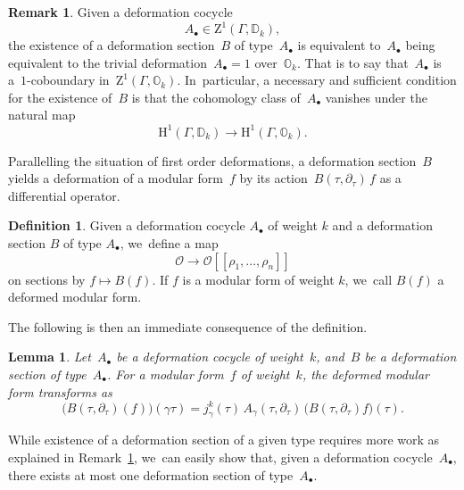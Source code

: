 \documentclass[JEP,XML,SOM,Unicode,published]{cedram}
\let\oldbullet\bullet
\renewcommand{\bullet}{{\scriptscriptstyle\oldbullet}}
\theoremstyle{plain}
\newtheorem{lemma}[theoremcounter]{Lemma}
\theoremstyle{definition}
\newtheorem{definition}[theoremcounter]{Definition}
\newtheorem{remark}[theoremcounter]{Remark}
\newcommand{\tx}{\text}
\newcommand{\bbD}{\ensuremath{\mathbb{D}}}
\newcommand{\bbO}{\ensuremath{\mathbb{O}}}
\newcommand{\cO}{\ensuremath{\mathcal{O}}}
\newcommand{\rmH}{\ensuremath{\mathrm{H}}}
\newcommand{\rmZ}{\ensuremath{\mathrm{Z}}}
\newcommand{\llbrkt}{[\![}
\newcommand{\rrbrkt}{]\!]}
\let\Ga\Gamma
\let\ga\gamma
\begin{document}
\begin{remark}
\label{rm:algebraic_deformation_section_existence}
Given a deformation cocycle
\begin{equation*}A_\bullet\in \rmZ^1(\Ga,\bbD_k),\end{equation*}
the existence of a deformation section~$B$ of type~$A_\bullet$ is equivalent to~$A_\bullet$ being equivalent to the trivial deformation~$A_\bullet=1$ over~$\bbO_k$. That is to say that~$A_\bullet$ is a~$1$-coboundary in~$\rmZ^1(\Ga,\bbO_k)$. In~particular, a necessary and sufficient condition for the existence of~$B$ is that the cohomology class of~$A_\bullet$ vanishes under the natural map
\begin{equation*}\rmH^1(\Ga,\bbD_k) \to \rmH^1(\Ga,\bbO_k)\tx{.}\end{equation*}
\end{remark}

Parallelling the situation of first order deformations, a deformation section~$B$ yields a deformation of a modular form~$f$ by its action~$B(\tau, \partial_\tau)\, f$ as a differential operator.

\begin{definition}\label{def:deformed-forms}
Given a deformation cocycle $A_\bullet$ of weight $k$ and a deformation section $B$ of type $A_\bullet$, we~define a map
\begin{equation*}\cO\to \cO \llbrkt \rho_1,\ldots,\rho_n\rrbrkt\end{equation*}
on sections by $f\mapsto B(f)$. If $f$ is a modular form of weight $k$, we~call $B(f)$ a deformed modular form.
\end{definition}

The following is then an immediate consequence of the definition.

\begin{lemma}
\label{lem:deformed-transformation}
Let~$A_\bullet$ be a deformation cocycle of weight~$k$, and~$B$ be a deformation section of type~$A_\bullet$. For a modular form~$f$ of weight~$k$, the deformed modular form transforms as
\begin{equation*}
\bigl(B(\tau, \partial_\tau)(f) \bigr)(\ga\tau)
=
j_\gamma^{k}(\tau)\, A_\ga(\tau, \partial_\tau)\, \bigl(B(\tau, \partial_\tau) f \bigr)(\tau)
\tx{.}
\end{equation*}
\end{lemma}

While existence of a deformation section of a given type requires more work as explained in Remark~\ref{rm:algebraic_deformation_section_existence}, we~can easily show that, given a deformation cocycle~$A_\bullet$, there exists at most one deformation section of type~$A_\bullet$.
\end{document}

